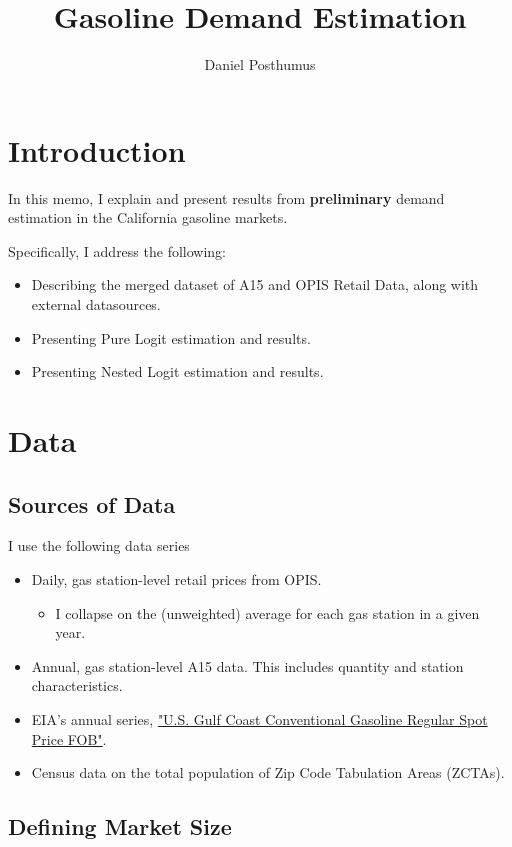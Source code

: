 \documentclass{article}
\title{Gasoline Demand Estimation}
\author{Daniel Posthumus}
\begin{document}
\maketitle

\section{Introduction}

In this memo, I explain and present results from \textbf{preliminary} demand estimation in the California gasoline markets.

Specifically, I address the following:
\begin{itemize}
	\item Describing the merged dataset of A15 and OPIS Retail Data, along with external datasources.
	\item Presenting Pure Logit estimation and results.
	\item Presenting Nested Logit estimation and results.
\end{itemize}

\section{Data} 

\subsection{Sources of Data}

I use the following data series
\begin{itemize}
	\item Daily, gas station-level retail prices from OPIS.
		\begin{itemize}
			\item I collapse on the (unweighted) average for each gas station in a given year.
		\end{itemize}
	\item Annual, gas station-level A15 data. This includes quantity and station characteristics.
	\item EIA's annual series, \href{https://www.eia.gov/dnav/pet/hist/LeafHandler.ashx?n=PET&s=EER_EPMRU_PF4_RGC_DPG&f=A}{"U.S. Gulf Coast Conventional Gasoline Regular Spot Price FOB"}.
	\item Census data on the total population of Zip Code Tabulation Areas (ZCTAs).
\end{itemize}

\subsection{Defining Market Size}
\end{document}
